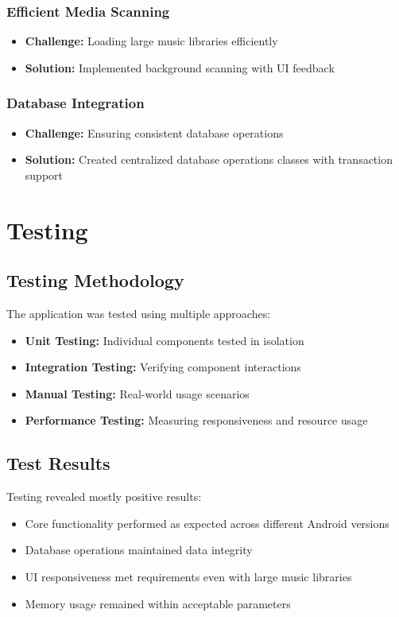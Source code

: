 \documentclass{article}
\begin{document}
\subsubsection{Efficient Media Scanning}
\begin{itemize}
    \item \textbf{Challenge:} Loading large music libraries efficiently
    \item \textbf{Solution:} Implemented background scanning with UI feedback
\end{itemize}

\subsubsection{Database Integration}
\begin{itemize}
    \item \textbf{Challenge:} Ensuring consistent database operations
    \item \textbf{Solution:} Created centralized database operations classes with transaction support
\end{itemize}

\section{Testing}
\subsection{Testing Methodology}
The application was tested using multiple approaches:
\begin{itemize}
    \item \textbf{Unit Testing:} Individual components tested in isolation
    \item \textbf{Integration Testing:} Verifying component interactions
    \item \textbf{Manual Testing:} Real-world usage scenarios
    \item \textbf{Performance Testing:} Measuring responsiveness and resource usage
\end{itemize}

\subsection{Test Results}
Testing revealed mostly positive results:
\begin{itemize}
    \item Core functionality performed as expected across different Android versions
    \item Database operations maintained data integrity
    \item UI responsiveness met requirements even with large music libraries
    \item Memory usage remained within acceptable parameters
\end{itemize}
\end{document}
